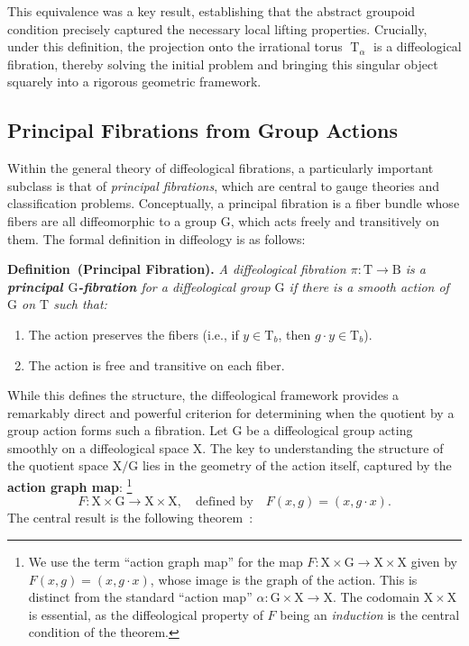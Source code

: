 \documentclass[10pt,reqno,letterpaper,twoside]{amsart}
\theoremstyle{article}
\newenvironment{definition}[1]%
{\noindent\textbf{Definition#1.} \it}%
{}
\newcommand{\eF}{{F}}
\def \B{\mathrm B}
\def \G{\mathrm G}
\def \T{\mathrm T}
\def \X{\mathrm X}
\newcommand{\Torus}{\operatorname{T}}
\begin{document}
  This equivalence was a key result,
  establishing that the abstract groupoid condition precisely captured the necessary local lifting properties.
  Crucially,
  under this definition,
  the projection onto the irrational torus $\Torus_\alpha$ is a diffeological fibration,
  thereby solving the initial problem and bringing this singular object squarely into a rigorous geometric framework.
  
  \subsection{Principal Fibrations from Group Actions}
  
  Within the general theory of diffeological fibrations,
  a particularly important subclass is that of \emph{principal fibrations},
  which are central to gauge theories and classification problems.
  Conceptually,
  a principal fibration is a fiber bundle whose fibers are all diffeomorphic to a group $\G$,
  which acts freely and transitively on them.
  The formal definition in diffeology is as follows:
  
  \begin{definition}{~(Principal Fibration)}
    A diffeological fibration $\pi: \T \to \B$ is a \textbf{principal $\G$-fibration} for a diffeological group $\G$ if there is a smooth action of $\G$ on $\T$ such that:
    \begin{enumerate}
      \item The action preserves the fibers (i.e., if $y \in \T_b$, then $g \cdot y \in \T_b$).
      \item The action is free and transitive on each fiber.
    \end{enumerate}
  \end{definition}
  
  While this defines the structure,
  the diffeological framework provides a remarkably direct and powerful criterion for determining when the quotient by a group action forms such a fibration.
  Let $\G$ be a diffeological group acting smoothly on a diffeological space $\X$.
  The key to understanding the structure of the quotient space $\X/\G$ lies in the geometry of the action itself,
  captured by the \textbf{action graph map}:%
  \footnote{We use the term ``action graph map'' for the map $\eF: \X \times \G \to \X \times \X$ given by $\eF(x,g) = (x, g \cdot x)$,
  whose image is the graph of the action.
  This is distinct from the standard ``action map'' $\alpha: \G \times \X \to \X$.
  The codomain $\X \times \X$ is essential,
  as the diffeological property of $\eF$ being an \emph{induction} is the central condition of the theorem.}
  \[
  \eF : \X \times \G \to \X \times \X, \quad \text{defined by} \quad \eF(x,g) = (x, g \cdot x).
  \]
  The central result is the following theorem~\cite{PIZ85, PIZ13}:
  
\end{document}
